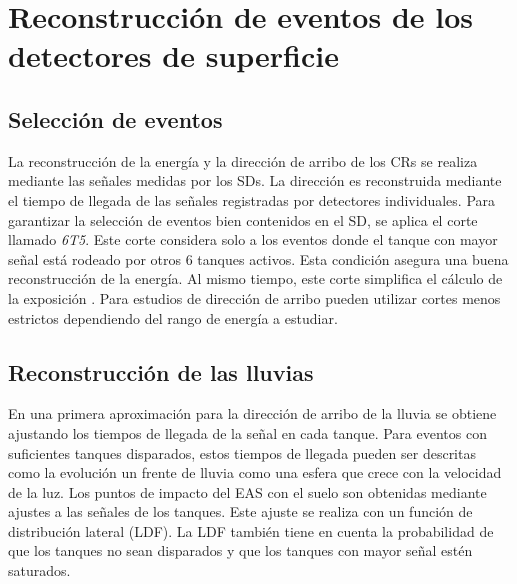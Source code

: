 \section{Reconstrucción de eventos de los detectores  de superficie}

\subsection{Selección de eventos}

La reconstrucción de la energía y la dirección de arribo de los CRs se realiza mediante las señales medidas por los SDs. La dirección es reconstruida mediante  el tiempo de llegada de las señales registradas por detectores individuales. Para garantizar la selección de eventos bien contenidos en el SD, se aplica el corte llamado \emph{6T5}. Este corte considera solo a los eventos donde el tanque con mayor señal está rodeado por otros 6 tanques activos. Esta condición asegura una buena reconstrucción de la energía. Al mismo tiempo, este corte simplifica el cálculo de la exposición \cite{exposure}. Para estudios de dirección de arribo pueden utilizar cortes menos estrictos dependiendo del rango de energía a estudiar.

\subsection{Reconstrucción de las lluvias}

En una primera aproximación para la dirección de arribo de la lluvia se obtiene ajustando los tiempos de llegada de la señal en cada tanque. Para eventos con suficientes tanques disparados, estos tiempos de llegada pueden ser descritas como la evolución un frente de lluvia como una esfera que crece con la velocidad de la luz. Los puntos de impacto del EAS con el suelo son obtenidas mediante ajustes a las señales de los tanques. Este ajuste se realiza con un función de distribución lateral (LDF). La LDF también tiene en cuenta la probabilidad de que los tanques no sean disparados y que los tanques con mayor señal estén saturados.

